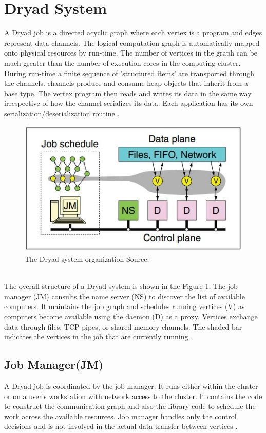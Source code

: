 \documentclass[9pt,twocolumn,twoside]{../../styles/osajnl}
\begin{document}
\section{Dryad System}
A Dryad job is a directed acyclic graph where each vertex is a program and edges represent data channels. The logical computation graph is automatically mapped onto physical resources by run-time. The number of vertices in the graph can be much greater than the number of execution cores in the computing cluster. During run-time a finite sequence of 'structured items' are transported through the channels. channels produce and consume heap objects that inherit from a base type. The vertex program then reads and writes its data in the same way irrespective of how the channel serializes its data. Each application has its own serialization/deserialization routine \cite{DryadMSR2}.
\begin{figure}[htbp]
\begin{center}
\centering
\includegraphics[width=\linewidth]{images/img1}
\caption{The Dryad system organization Source:\cite{DryadMSR2}}
\label{fig:DryadSystem}
\end{center}
\end{figure}\\
The overall structure of a Dryad system is shown in the Figure \ref{fig:DryadSystem}. The job manager (JM) consults the name server (NS) to discover the list of available computers. It maintains the job graph and schedules running vertices (V) as computers become available using the daemon (D) as a proxy. Vertices exchange data through files, TCP pipes, or shared-memory channels. The shaded bar indicates the vertices in the job that are currently running \cite{DryadMSR2}. 
\subsection{Job Manager(JM)}
A Dryad job is coordinated by the job manager. It runs either within the cluster or on a user’s workstation with network access to the cluster. It contains the code to construct the communication graph and also the library code to schedule the work across the available resources. Job manager handles only the control decisions and is not involved in the actual data transfer between vertices \cite{DryadMSR2}.
\end{document}
